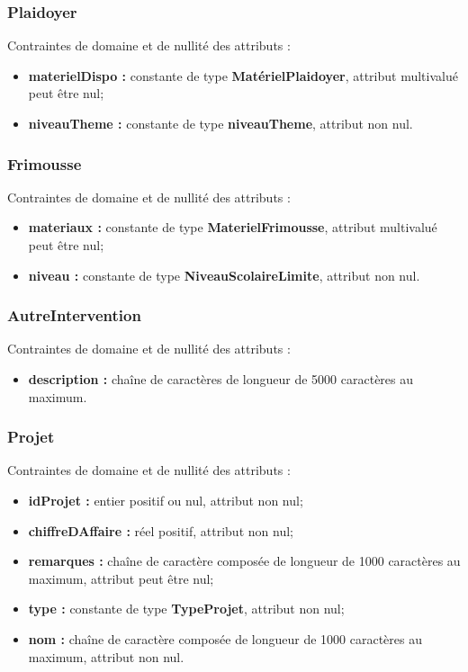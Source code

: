 \subsubsection*{Plaidoyer}
Contraintes de domaine et de nullité des attributs :
\begin{itemize}
	\item \textbf{materielDispo :} constante de type \textbf{MatérielPlaidoyer}, attribut multivalué peut être nul; 
	\item \textbf{niveauTheme :} constante de type \textbf{niveauTheme}, attribut non nul.\\
\end{itemize}

\subsubsection*{Frimousse}
Contraintes de domaine et de nullité des attributs :
\begin{itemize}
	\item \textbf{materiaux :} constante de type \textbf{MaterielFrimousse}, attribut multivalué peut être nul;
	\item \textbf{niveau :} constante de type \textbf{NiveauScolaireLimite}, attribut non nul.\\
\end{itemize}

\subsubsection*{AutreIntervention}
Contraintes de domaine et de nullité des attributs :
\begin{itemize}
\item \textbf{description :} chaîne de caractères de longueur de 5000 caractères au maximum.\\
\end{itemize}

\subsubsection*{Projet}
Contraintes de domaine et de nullité des attributs :
\begin{itemize}
 	\item \textbf{idProjet :} entier positif ou nul, attribut non nul;
	\item \textbf{chiffreDAffaire :} réel positif, attribut non nul;
	\item \textbf{remarques :} chaîne de caractère composée de longueur de 1000 caractères au maximum, attribut peut être nul;
	\item \textbf{type :} constante de type \textbf{TypeProjet}, attribut non nul;
	\item \textbf{nom :} chaîne de caractère composée de longueur de 1000 caractères au maximum, attribut non nul.\\  
\end{itemize} 

